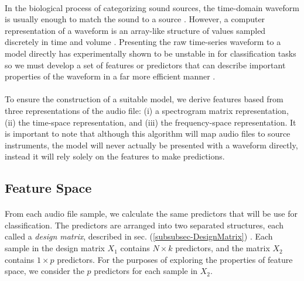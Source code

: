 \documentclass[12pt,letterpaper]{article}
\begin{document}
\paragraph*{}In the biological process of categorizing sound sources, the time-domain waveform is usually enough to match the sound to a source \cite{Olson}. However, a computer representation of a waveform is an array-like structure of values sampled discretely in time and volume \cite{Virtanen,Liu}. Presenting the raw time-series waveform to a model directly has experimentally shown to be unstable in for classification tasks so we must develop a set of features or predictors that can describe important properties of the waveform in a far more efficient manner \cite{Goodfellow,James,Serizel}.

\paragraph*{}To ensure the construction of a suitable model, we derive features based from three representations of the audio file: (i) a spectrogram matrix representation, (ii) the time-space representation, and (iii) the frequency-space representation. It is important to note that although this algorithm will map audio files to source instruments, the model will never actually be presented with a waveform directly, instead it will rely solely on the features to make predictions.


\subsection{Feature Space}

\paragraph*{}From each audio file sample, we calculate the same predictors that will be use for classification. The predictors are arranged into two separated structures, each called a \textit{design matrix}, described in sec. (\ref{subsubsec-DesignMatrix}) \cite{Goodfellow,Geron}. Each sample in the design matrix $X_1$ contains $N \times k$ predictors, and the matrix $X_2$ contains $1 \times p$ predictors. For the purposes of exploring the properties of feature space, we consider the $p$ predictors for each sample in $X_2$.
\end{document}
